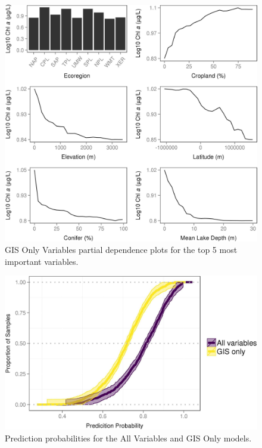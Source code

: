 \documentclass[12pt,]{article}
\begin{document}
\begin{figure}[htbp]
\centering
\includegraphics{manuscript_files/figure-latex/gis_partial_dependence-1.jpeg}
\caption{GIS Only Variables partial dependence plots for the top 5 most
important variables. \label{fig:gis_partial_dependence}}
\end{figure}

\newpage

\begin{figure}[htbp]
\centering
\includegraphics{manuscript_files/figure-latex/prob_cdf-1.jpeg}
\caption{Prediction probabilities for the All Variables and GIS Only
models. \label{fig:prob_cdf}}
\end{figure}
\end{document}
